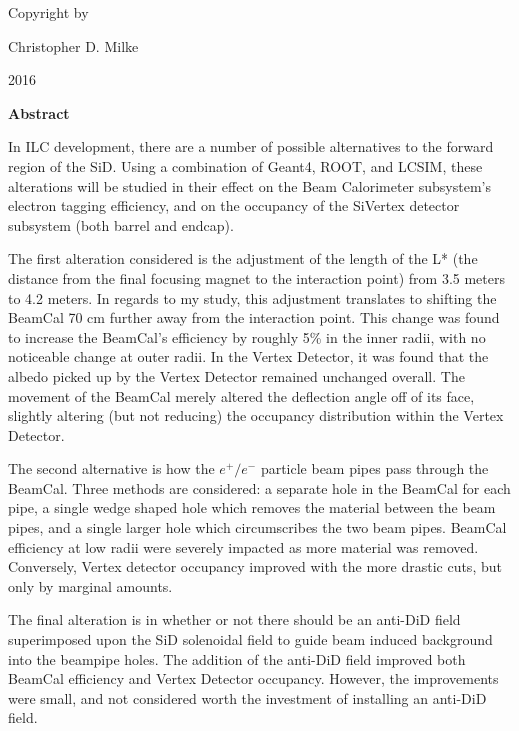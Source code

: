 \documentclass{report}
\begin{document}
    \newpage \begin{center} 
        \vspace*{\fill}
        Copyright \textcopyright by

        Christopher D. Milke 

        2016
        \vspace*{\fill}
    \end{center} \newpage


        \begin{center} \LARGE \textbf{Abstract} \end{center}

        In ILC development, there are a number of possible alternatives to the forward region of the SiD. Using a combination of Geant4, ROOT, and LCSIM, these alterations will be studied in their effect on the Beam Calorimeter subsystem's electron tagging efficiency, and on the occupancy of the SiVertex detector subsystem (both barrel and endcap).

        The first alteration considered is the adjustment of the length of the L* (the distance from the final focusing magnet to the interaction point) from 3.5 meters to 4.2 meters. In regards to my study, this adjustment translates to shifting the BeamCal 70 cm further away from the interaction point. This change was found to increase the BeamCal's efficiency by roughly 5\% in the inner radii, with no noticeable change at outer radii. In the Vertex Detector, it was found that the albedo picked up by the Vertex Detector remained unchanged overall. The movement of the BeamCal merely altered the deflection angle off of its face, slightly altering (but not reducing) the occupancy distribution within the Vertex Detector.

        The second alternative is how the $e^+/e^-$ particle beam pipes pass through the BeamCal. Three methods are considered: a separate hole in the BeamCal for each pipe, a single wedge shaped hole which removes the material between the beam pipes, and a single larger hole which circumscribes the two beam pipes. BeamCal efficiency at low radii were severely impacted as more material was removed. Conversely, Vertex detector occupancy improved with the more drastic cuts, but only by marginal amounts.

        The final alteration is in whether or not there should be an anti-DiD field superimposed upon the SiD solenoidal field to guide beam induced background into the beampipe holes. The addition of the anti-DiD field improved both BeamCal efficiency and Vertex Detector occupancy. However, the improvements were small, and not considered worth the investment of installing an anti-DiD field.
    \newpage
\end{document}

